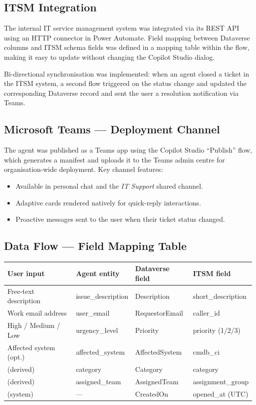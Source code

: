 \documentclass[12pt, a4paper]{article}
\begin{document}
\subsection{ITSM Integration}

The internal IT service management system was integrated via its REST API using an HTTP
connector in Power Automate. Field mapping between Dataverse columns and ITSM schema
fields was defined in a mapping table within the flow, making it easy to update without
changing the Copilot Studio dialog.

Bi-directional synchronisation was implemented: when an agent closed a ticket in the ITSM
system, a second flow triggered on the status change and updated the corresponding Dataverse
record and sent the user a resolution notification via Teams.

\subsection{Microsoft Teams --- Deployment Channel}

The agent was published as a Teams app using the Copilot Studio ``Publish'' flow, which
generates a manifest and uploads it to the Teams admin centre for organisation-wide
deployment. Key channel features:

\begin{itemize}[leftmargin=*]
  \item Available in personal chat and the \emph{IT Support} shared channel.
  \item Adaptive cards rendered natively for quick-reply interactions.
  \item Proactive messages sent to the user when their ticket status changed.
\end{itemize}

\subsection{Data Flow --- Field Mapping Table}

\begin{center}
\begin{tabularx}{\linewidth}{X X X X}
\toprule
\textbf{User input} & \textbf{Agent entity} & \textbf{Dataverse field} & \textbf{ITSM field} \\
\midrule
Free-text description & issue\_description & Description & short\_description \\
Work email address & user\_email & RequestorEmail & caller\_id \\
High / Medium / Low & urgency\_level & Priority & priority (1/2/3) \\
Affected system (opt.) & affected\_system & AffectedSystem & cmdb\_ci \\
(derived) & category & Category & category \\
(derived) & assigned\_team & AssignedTeam & assignment\_group \\
(system) & --- & CreatedOn & opened\_at (UTC) \\
\bottomrule
\end{tabularx}
\end{center}
\end{document}
